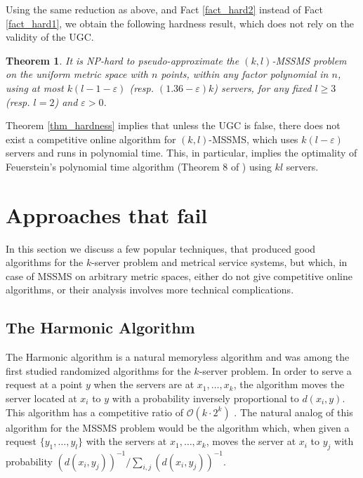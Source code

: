 \documentclass[11pt]{article}
\theoremstyle{plain}\newtheorem{theorem}{Theorem}
\theoremstyle{definition}
\theoremstyle{remark}
\begin{document}
Using the same reduction as above, and Fact \ref{fact_hard2} instead of Fact \ref{fact_hard1}, we obtain the following hardness result, which does not rely on the validity of the UGC.

\begin{theorem}
It is NP-hard to pseudo-approximate the $(k,l)$-MSSMS problem on the uniform metric space with $n$ points, within any factor polynomial in $n$, using at most $k(l-1-\varepsilon)$ (resp. $(1.36-\varepsilon)k$) servers, for any fixed $l\geq 3$ (resp. $l=2$) and $\varepsilon>0$.
\end{theorem}

Theorem \ref{thm_hardness} implies that unless the UGC is false, there does not exist a competitive online algorithm for $(k,l)$-MSSMS, which uses $k(l-\varepsilon)$ servers and runs in polynomial time. This, in particular, implies the optimality of Feuerstein's polynomial time algorithm (Theorem 8 of \cite{Feuerstein98}) using $kl$ servers.

\section{Approaches that fail}\label{sec_limitations}

In this section we discuss a few popular techniques, that produced good algorithms for the $k$-server problem and metrical service systems, but which, in case of MSSMS on arbitrary metric spaces, either do not give competitive online algorithms, or their analysis involves more technical complications.

\subsection{The Harmonic Algorithm}

The Harmonic algorithm is a natural memoryless algorithm and was among the first studied randomized algorithms for the $k$-server problem. In order to serve a request at a point $y$ when the servers are at $x_1,\ldots,x_k$, the algorithm moves the server located at $x_i$ to $y$ with a probability inversely proportional to $d(x_i,y)$. This algorithm has a competitive ratio of $\mathcal{O}(k\cdot2^k)$ \cite{Grove91, BartalG00}. The natural analog of this algorithm for the MSSMS problem would be the algorithm which, when given a request $\{y_1,\ldots,y_l\}$ with the servers at $x_1,\ldots,x_k$, moves the server at $x_i$ to $y_j$ with probability $(d(x_i,y_j))^{-1}/\sum_{i,j}(d(x_i,y_j))^{-1}$.
\end{document}

